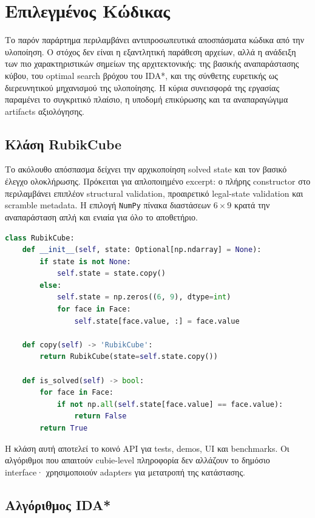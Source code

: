 \chapter{Επιλεγμένος Κώδικας}
\label{app:code}

Το παρόν παράρτημα περιλαμβάνει αντιπροσωπευτικά αποσπάσματα κώδικα από την υλοποίηση. Ο στόχος δεν είναι η εξαντλητική παράθεση αρχείων, αλλά η ανάδειξη των πιο χαρακτηριστικών σημείων της αρχιτεκτονικής: της βασικής αναπαράστασης κύβου, του optimal search βρόχου του IDA*, και της σύνθετης ευρετικής ως διερευνητικού μηχανισμού της υλοποίησης. Η κύρια συνεισφορά της εργασίας παραμένει το συγκριτικό πλαίσιο, η υποδομή επικύρωσης και τα αναπαραγώγιμα artifacts αξιολόγησης.

\section{Κλάση RubikCube}

Το ακόλουθο απόσπασμα δείχνει την αρχικοποίηση solved state και τον βασικό έλεγχο ολοκλήρωσης. Πρόκειται για απλοποιημένο excerpt: ο πλήρης constructor στο  περιλαμβάνει επιπλέον structural validation, προαιρετικό legal-state validation και scramble metadata. Η επιλογή \texttt{NumPy} πίνακα διαστάσεων $6 \times 9$ κρατά την αναπαράσταση απλή και ενιαία για όλο το αποθετήριο.

\begin{lstlisting}[language=Python, caption={Βασικός πυρήνας της κλάσης \texttt{RubikCube}}, label={lst:rubikcube_core}]
class RubikCube:
    def __init__(self, state: Optional[np.ndarray] = None):
        if state is not None:
            self.state = state.copy()
        else:
            self.state = np.zeros((6, 9), dtype=int)
            for face in Face:
                self.state[face.value, :] = face.value

    def copy(self) -> 'RubikCube':
        return RubikCube(state=self.state.copy())

    def is_solved(self) -> bool:
        for face in Face:
            if not np.all(self.state[face.value] == face.value):
                return False
        return True
\end{lstlisting}

Η κλάση αυτή αποτελεί το κοινό API για tests, demos, UI και benchmarks. Οι αλγόριθμοι που απαιτούν cubie-level πληροφορία δεν αλλάζουν το δημόσιο interface· χρησιμοποιούν adapters για μετατροπή της κατάστασης.

\section{Αλγόριθμος IDA*}

